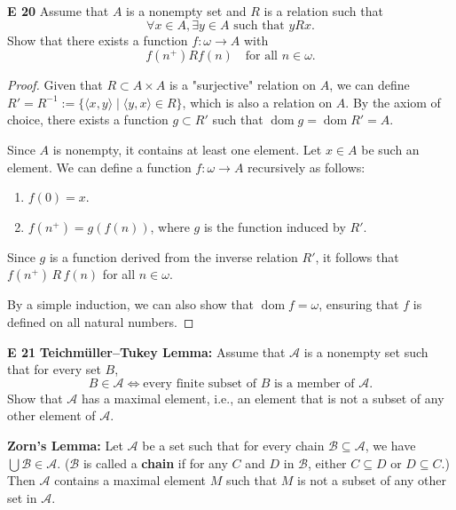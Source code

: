 \begin{question}
    \textbf{E 20 } 
    Assume that \( A \) is a nonempty set and \( R \) is a relation such that 
    \[
    \forall x \in A, \exists y \in A \text{ such that } yRx.
    \]
    Show that there exists a function \( f: \omega \to A \) with 
    \[
    f(n^+) R f(n) \quad \text{for all } n \in \omega.
    \]
\end{question}
\begin{proof}
    Given that \( R \subset A \times A \) is a "surjective" relation on \( A \), we can define \( R' = R^{-1} := \{ \langle x, y \rangle \mid \langle y, x \rangle \in R \} \), which is also a relation on \( A \). By the axiom of choice, there exists a function \( g \subset R' \) such that \( \operatorname{dom} g = \operatorname{dom} R' = A\).

    Since \( A \) is nonempty, it contains at least one element. Let \( x \in A \) be such an element. We can define a function \( f: \omega \to A \) recursively as follows:

    \begin{enumerate}
        \item \( f(0) = x \).
        \item \( f(n^+) = g(f(n)) \), where \( g \) is the function induced by \( R' \).
    \end{enumerate}

    Since \( g \) is a function derived from the inverse relation \( R' \), it follows that \( f(n^+) \, R \, f(n) \) for all \( n \in \omega \).

    By a simple induction, we can also show that \( \operatorname{dom} f = \omega \), ensuring that \( f \) is defined on all natural numbers.
\end{proof}
\begin{question}
    \textbf{E 21}
    \textbf{Teichmüller--Tukey Lemma:} Assume that \(\mathcal{A}\) is a nonempty set such that for every set \(B\),
    \[
    B \in \mathcal{A} \iff \text{every finite subset of } B \text{ is a member of } \mathcal{A}.
    \]
    Show that \(\mathcal{A}\) has a maximal element, i.e., an element that is not a subset of any other element of \(\mathcal{A}\).
\end{question}
\textbf{Zorn's Lemma:}
Let \(\mathcal{A}\) be a set such that for every chain \(\mathcal{B} \subseteq \mathcal{A}\), we have \(\bigcup \mathcal{B} \in \mathcal{A}\). (\(\mathcal{B}\) is called a \textbf{chain} if for any \(C\) and \(D\) in \(\mathcal{B}\), either \(C \subseteq D\) or \(D \subseteq C\).) Then \(\mathcal{A}\) contains a maximal element \(M\) such that \(M\) is not a subset of any other set in \(\mathcal{A}\).

